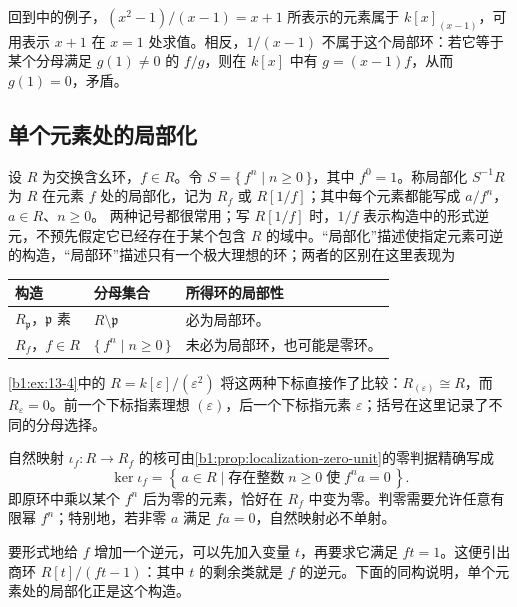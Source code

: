 \ProseParagraphBreak
回到中的例子，\((x^2-1)/(x-1)=x+1\) 所表示的元素属于 \(k[x]_{(x-1)}\)，可用表示 \(x+1\) 在 \(x=1\) 处求值。相反，\(1/(x-1)\) 不属于这个局部环：若它等于某个分母满足 \(g(1)\neq0\) 的 \(f/g\)，则在 \(k[x]\) 中有 \(g=(x-1)f\)，从而 \(g(1)=0\)，矛盾。

\subsection{单个元素处的局部化}
\label{b1:subsec:1303:02}

设 \(R\) 为交换含幺环，\(f\in R\)。令 \(S=\{\,f^n\mid n\geq0\,\}\)，其中 \(f^0=1\)。称局部化 \(S^{-1}R\) 为 \(R\) 在元素 \(f\) 处的局部化，记为 \(R_f\) 或 \(R[1/f]\)；其中每个元素都能写成 \(a/f^n\)，\(a\in R\)、\(n\geq0\)。
两种记号都很常用；写 \(R[1/f]\) 时，\(1/f\) 表示构造中的形式逆元，不预先假定它已经存在于某个包含 \(R\) 的域中。“局部化”描述使指定元素可逆的构造，“局部环”描述只有一个极大理想的环；两者的区别在这里表现为
\begin{center}
	\begin{tabularx}{\linewidth}{@{}lXX@{}}
		\toprule
		构造 & 分母集合 & 所得环的局部性 \\
		\midrule
		\(R_{\mathfrak p}\)，\(\mathfrak p\) 素 & \(R\setminus\mathfrak p\) & 必为局部环。 \\
		\(R_f\)，\(f\in R\) & \(\{\,f^n\mid n\ge0\,\}\) & 未必为局部环，也可能是零环。 \\
		\bottomrule
	\end{tabularx}
\end{center}
\cref{b1:ex:13-4}中的 \(R=k[\varepsilon]/(\varepsilon^2)\) 将这两种下标直接作了比较：\(R_{(\varepsilon)}\cong R\)，而 \(R_{\varepsilon}=0\)。前一个下标指素理想 \((\varepsilon)\)，后一个下标指元素 \(\varepsilon\)；括号在这里记录了不同的分母选择。

\ProseParagraphBreak
自然映射 \(\iota_f:R\rightarrow R_f\) 的核可由\cref{b1:prop:localization-zero-unit}的零判据精确写成
\[
	\ker\iota_f= \left\{\,a\in R\mid \text{存在整数}\;n\ge0\;\text{使}\;f^na=0\,\right\}.
\]
即原环中乘以某个 \(f^n\) 后为零的元素，恰好在 \(R_f\) 中变为零。判零需要允许任意有限幂 \(f^n\)；特别地，若非零 \(a\) 满足 \(fa=0\)，自然映射必不单射。

\ProseParagraphBreak
要形式地给 \(f\) 增加一个逆元，可以先加入变量 \(t\)，再要求它满足 \(ft=1\)。这便引出商环 \(R[t]/(ft-1)\)：其中 \(t\) 的剩余类就是 \(f\) 的逆元。下面的同构说明，单个元素处的局部化正是这个构造。

